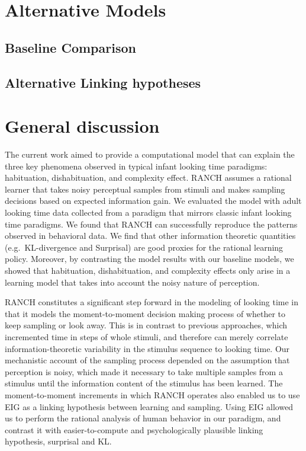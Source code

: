 \documentclass[10pt, letterpaper]{article}
\begin{document}
\hypertarget{alternative-models}{%
\section{Alternative Models}\label{alternative-models}}

\hypertarget{baseline-comparison}{%
\subsection{Baseline Comparison}\label{baseline-comparison}}

\hypertarget{alternative-linking-hypotheses}{%
\subsection{Alternative Linking
hypotheses}\label{alternative-linking-hypotheses}}

\hypertarget{general-discussion}{%
\section{General discussion}\label{general-discussion}}

The current work aimed to provide a computational model that can explain
the three key phenomena observed in typical infant looking time
paradigms: habituation, dishabituation, and complexity effect. RANCH
assumes a rational learner that takes noisy perceptual samples from
stimuli and makes sampling decisions based on expected information gain.
We evaluated the model with adult looking time data collected from a
paradigm that mirrors classic infant looking time paradigms. We found
that RANCH can successfully reproduce the patterns observed in
behavioral data. We find that other information theoretic quantities
(e.g.~KL-divergence and Surprisal) are good proxies for the rational
learning policy. Moreover, by contrasting the model results with our
baseline models, we showed that habituation, dishabituation, and
complexity effects only arise in a learning model that takes into
account the noisy nature of perception.

RANCH constitutes a significant step forward in the modeling of looking
time in that it models the moment-to-moment decision making process of
whether to keep sampling or look away. This is in contrast to previous
approaches, which incremented time in steps of whole stimuli, and
therefore can merely correlate information-theoretic variability in the
stimulus sequence to looking time. Our mechanistic account of the
sampling process depended on the assumption that perception is noisy,
which made it necessary to take multiple samples from a stimulus until
the information content of the stimulus has been learned. The
moment-to-moment increments in which RANCH operates also enabled us to
use EIG as a linking hypothesis between learning and sampling. Using EIG
allowed us to perform the rational analysis of human behavior in our
paradigm, and contrast it with easier-to-compute and psychologically
plausible linking hypothesis, surprisal and KL.
\end{document}
